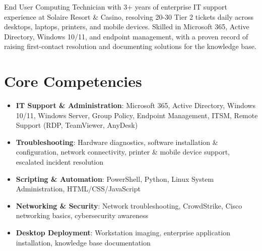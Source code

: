 \documentclass[11pt,a4paper,sans]{moderncv}
\begin{document}
\makecvtitle


\vspace{6pt}
\small{End User Computing Technician with 3+ years of enterprise IT support experience at Solaire Resort \& Casino, resolving 20-30 Tier 2 tickets daily across desktops, laptops, printers, and mobile devices. Skilled in Microsoft 365, Active Directory, Windows 10/11, and endpoint management, with a proven record of raising first-contact resolution and documenting solutions for the knowledge base.}


\section{Core Competencies}
\vspace{1pt}
\begin{itemize}

\item \textbf{IT Support \& Administration}: Microsoft 365, Active Directory, Windows 10/11, Windows Server, Group Policy, Endpoint Management, ITSM, Remote Support (RDP, TeamViewer, AnyDesk)

\item \textbf{Troubleshooting}: Hardware diagnostics, software installation \& configuration, network connectivity, printer \& mobile device support, escalated incident resolution

\item \textbf{Scripting \& Automation}: PowerShell, Python, Linux System Administration, HTML/CSS/JavaScript

\item \textbf{Networking \& Security}: Network troubleshooting, CrowdStrike, Cisco networking basics, cybersecurity awareness

\item \textbf{Desktop Deployment}: Workstation imaging, enterprise application installation, knowledge base documentation

\end{itemize}

\end{document}
